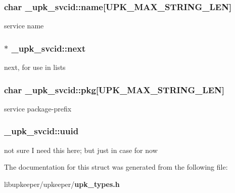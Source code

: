 \subsubsection[{name}]{\setlength{\rightskip}{0pt plus 5cm}char {\bf \_\-upk\_\-svcid::name}[UPK\_\-MAX\_\-STRING\_\-LEN]}\label{struct__upk__svcid_abe2d59cc8836ed4791582075c5f24102}
service name 
\subsubsection[{next}]{$\ast$ {\bf \_\-upk\_\-svcid::next}}\label{struct__upk__svcid_a776066487e206e67f457156db9c9943d}
next, for use in lists 
\subsubsection[{pkg}]{\setlength{\rightskip}{0pt plus 5cm}char {\bf \_\-upk\_\-svcid::pkg}[UPK\_\-MAX\_\-STRING\_\-LEN]}\label{struct__upk__svcid_aaa0bdc96910d275d9d0fa247508e18fc}
service package-\/prefix 
\subsubsection[{uuid}]{ {\bf \_\-upk\_\-svcid::uuid}}\label{struct__upk__svcid_a3b7d5a1866b60ecac8ea4dabe871dfbe}
not sure I need this here; but just in case for now 

The documentation for this struct was generated from the following file:\begin{DoxyCompactItemize}
\item 
libupkeeper/upkeeper/{\bf upk\_\-types.h}\end{DoxyCompactItemize}
